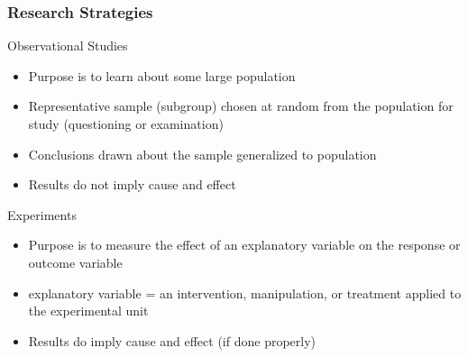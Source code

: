 \documentclass[10pt, compress]{beamer}
\begin{document}
\begin{frame}
    \frametitle{Research Strategies}
    \begin{block}{Observational Studies}
        \begin{itemize}
            \item Purpose is to learn about some large population
            \item Representative sample (subgroup) chosen at random from the population for study (questioning or examination)
            \item Conclusions drawn about the sample generalized to population
            \item Results do \alert{not} imply cause and effect
        \end{itemize}
    \end{block}
    \begin{block}{Experiments}
        \begin{itemize}
            \item Purpose is to measure the effect of an explanatory variable on the response or outcome variable
            \item explanatory variable = an intervention, manipulation, or treatment applied to the experimental unit
            \item Results do imply cause and effect (if done properly)
        \end{itemize}
    \end{block}
\end{frame}
\end{document}
